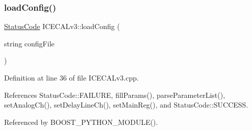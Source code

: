 \subsubsection{\texorpdfstring{load\+Config()}{loadConfig()}}
{\footnotesize\ttfamily \hyperlink{classStatusCode}{Status\+Code} I\+C\+E\+C\+A\+Lv3\+::load\+Config (\begin{DoxyParamCaption}\item[{string}]{config\+File }\end{DoxyParamCaption})}



Definition at line 36 of file I\+C\+E\+C\+A\+Lv3.\+cpp.



References Status\+Code\+::\+F\+A\+I\+L\+U\+RE, fill\+Params(), parse\+Parameter\+List(), set\+Analog\+Ch(), set\+Delay\+Line\+Ch(), set\+Main\+Reg(), and Status\+Code\+::\+S\+U\+C\+C\+E\+SS.



Referenced by B\+O\+O\+S\+T\+\_\+\+P\+Y\+T\+H\+O\+N\+\_\+\+M\+O\+D\+U\+L\+E().


